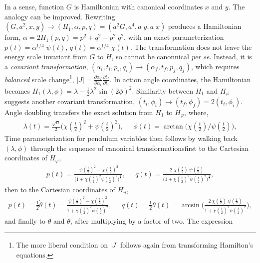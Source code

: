 \documentclass[nofootinbib,preprint]{revtex4-1}
\begin{document}
In a sense, function $G$ is Hamiltonian with canonical coordinates $x$ and $y$. The analogy can be 
improved. Rewriting $(G,a^2,x,y) \rightarrow (H_1,\alpha,p,q)=(a^2 G,a^4,a\;y,a\;x)$
produces a Hamiltonian form, $\alpha=2H_1(p,q)=p^2+q^2 - p^2 \; q^2$, with an exact parameterization 
${p(t)=\alpha^{1/4} \;\psi(t)}$, ${q(t)=\alpha^{1/4} \;\chi(t)}$. The transformation does not leave 
the energy scale invariant from $G$ to $H$, so cannot be canonnical \textit{per se}. Instead, it is a 
\textit{covariant transformation}, $(\alpha_i,t_i,p_i,q_i) \rightarrow (\alpha_f,t_f,p_f,q_f)$, 
which requires \textit{balanced} scale change\footnote{The more liberal 
condition on $|J|$ follows again from transforming Hamilton's equations. }, 
$|J| = \frac{\partial\alpha_f}{\partial \alpha_i}\frac{\partial t_f}{\partial t_i}$. In action angle 
coordinates, the Hamiltonian becomes $H_1(\lambda,\phi) = \lambda-\frac{1}{2}\lambda^2\sin(2\phi)^2$.
Similarity between $H_{1}$ and $H_{\varphi}$ suggests another covariant transformation, 
$(t_i,\phi_i)\rightarrow (t_f,\phi_f)=2(t_i,\phi_i)$.  Angle doubling transfers the exact 
solution from $H_{1}$ to $H_{\varphi}$, where, 
\begin{eqnarray}
\lambda(t) = \frac{\sqrt{\alpha}}{2}\Big(\chi(\tfrac{t}{2})^2 + \psi(\tfrac{t}{2})^2\Big), \;\;\;\;\; 
\phi(t)   =  \arctan\big(\chi(\tfrac{t}{2})/\psi(\tfrac{t}{2})\big),  \nonumber 
\end{eqnarray}
Time parameterization for pendulum variables then follows by walking back $(\lambda,\phi)$ through 
the sequence of canonical transformations\textemdash first to the Cartesian coordinates of $H_{\varphi}$,
\begin{eqnarray}
p(t)   =  \frac{ \; \psi(\tfrac{t}{2})^2-\chi(\tfrac{t}{2})^2 
}{\Big(1+\chi(\tfrac{t}{2})^2  \psi(\tfrac{t}{2})^2\Big)^{\frac{1}{2}}},  \;\;\;\;\; 
q(t)  = \frac{2 \;  \chi(\tfrac{t}{2})\;\psi(\tfrac{t}{2}) 
}{\Big(1+\chi(\tfrac{t}{2})^2 \psi(\tfrac{t}{2})^2\Big)^{\frac{1}{2}}}, \nonumber 
\end{eqnarray}
then to the Cartesian coordinates of $H_{\vartheta}$,
\begin{eqnarray}
p(t)   = \tfrac{1}{2} \dot{\theta}(t) = \frac{\psi(\tfrac{t}{2})^2 - \chi(\tfrac{t}{2})^2
}{1+\chi(\tfrac{t}{2})^2 \psi(\tfrac{t}{2})^2 }, \;\;\;\;\; 
q(t)   = \tfrac{1}{2} \theta(t) =  \arcsin\bigg(\frac{2\;\chi(\tfrac{t}{2})\; \psi(\tfrac{t}{2})
}{1+\chi(\tfrac{t}{2})^2 \psi(\tfrac{t}{2})^2 }\bigg), \nonumber 
\end{eqnarray}
and finally to $\theta$ and $\dot{\theta}$, after multiplying by a factor of two. The expression 
\end{document}
